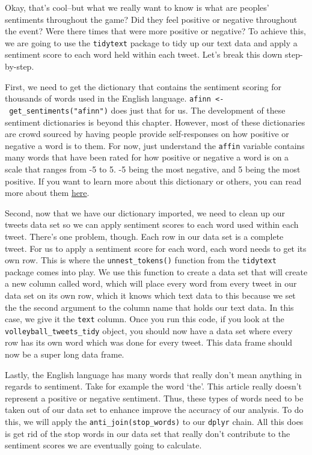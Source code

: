 \documentclass[
]{book}
\begin{document}
Okay, that's cool--but what we really want to know is what are peoples' sentiments throughout the game? Did they feel positive or negative throughout the event? Were there times that were more positive or negative? To achieve this, we are going to use the \texttt{tidytext} package to tidy up our text data and apply a sentiment score to each word held within each tweet. Let's break this down step-by-step.

First, we need to get the dictionary that contains the sentiment scoring for thousands of words used in the English language. \texttt{afinn\ \textless{}-\ get\_sentiments("afinn")} does just that for us. The development of these sentiment dictionaries is beyond this chapter. However, most of these dictionaries are crowd sourced by having people provide self-responses on how positive or negative a word is to them. For now, just understand the \texttt{affin} variable contains many words that have been rated for how positive or negative a word is on a scale that ranges from -5 to 5. -5 being the most negative, and 5 being the most positive. If you want to learn more about this dictionary or others, you can read more about them \href{https://www.tidytextmining.com/sentiment.html}{here}.

Second, now that we have our dictionary imported, we need to clean up our tweets data set so we can apply sentiment scores to each word used within each tweet. There's one problem, though. Each row in our data set is a complete tweet. For us to apply a sentiment score for each word, each word needs to get its own row. This is where the \texttt{unnest\_tokens()} function from the \texttt{tidytext} package comes into play. We use this function to create a data set that will create a new column called word, which will place every word from every tweet in our data set on its own row, which it knows which text data to this because we set the the second argument to the column name that holds our text data. In this case, we give it the \texttt{text} column. Once you run this code, if you look at the \texttt{volleyball\_tweets\_tidy} object, you should now have a data set where every row has its own word which was done for every tweet. This data frame should now be a super long data frame.

Lastly, the English language has many words that really don't mean anything in regards to sentiment. Take for example the word `the'. This article really doesn't represent a positive or negative sentiment. Thus, these types of words need to be taken out of our data set to enhance improve the accuracy of our analysis. To do this, we will apply the \texttt{anti\_join(stop\_words)} to our \texttt{dplyr} chain. All this does is get rid of the stop words in our data set that really don't contribute to the sentiment scores we are eventually going to calculate.
\end{document}
